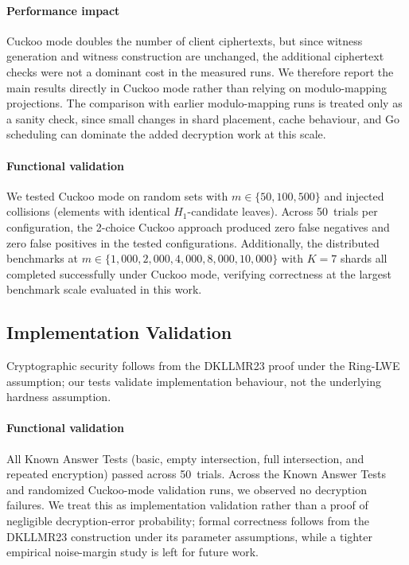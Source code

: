 \documentclass[preprint,12pt]{elsarticle}
\begin{document}
\paragraph{Performance impact}
Cuckoo mode doubles the number of client ciphertexts, but since witness
generation and witness construction are unchanged, the additional ciphertext
checks were not a dominant cost in the measured runs. We therefore report the
main results directly in Cuckoo mode rather than relying on modulo-mapping
projections. The comparison with earlier modulo-mapping runs is treated only
as a sanity check, since small changes in shard placement, cache behaviour,
and Go scheduling can dominate the added decryption work at this scale.

\paragraph{Functional validation}
We tested Cuckoo mode on random sets with $m \in \{50, 100, 500\}$ and
injected collisions (elements with identical $H_1$-candidate leaves). Across
50~trials per configuration, the 2-choice Cuckoo approach produced zero false
negatives and zero false positives in the tested configurations. Additionally,
the distributed benchmarks at $m \in \{1{,}000, 2{,}000, 4{,}000, 8{,}000,
10{,}000\}$ with $K=7$ shards all completed successfully under Cuckoo mode,
verifying correctness at the largest benchmark scale evaluated in this work.

\subsection{Implementation Validation}

Cryptographic security follows from the DKLLMR23 proof under the Ring-LWE
assumption; our tests validate implementation behaviour, not the underlying
hardness assumption.

\paragraph{Functional validation}
All Known Answer Tests (basic, empty intersection, full intersection, and
repeated encryption) passed across 50~trials. Across the Known Answer Tests
and randomized Cuckoo-mode validation runs, we observed no decryption
failures. We treat this as implementation validation rather than a proof of
negligible decryption-error probability; formal correctness follows from the
DKLLMR23 construction under its parameter assumptions, while a tighter
empirical noise-margin study is left for future work.
\end{document}
